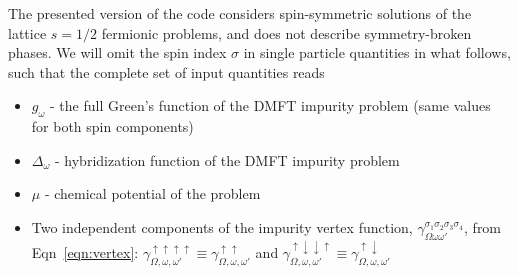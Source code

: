 \documentclass[3p,times,procedia]{elsarticle}
\begin{document}
The presented version of the code considers spin-symmetric solutions of the lattice $s=1/2$ fermionic problems, and does not describe symmetry-broken phases. We will omit the spin index $\sigma$ in single particle quantities in what follows, such that the complete set of input quantities reads
\begin{itemize}
\item $g_\omega$ - the full Green's function of the DMFT impurity problem (same values for both spin components)
\item $\Delta_{\omega}$ - hybridization function of the DMFT impurity problem
\item $\mu$ - chemical potential of the problem
\item Two independent components of the impurity vertex function, $\gamma_{\Omega\omega\omega'}^{\sigma_1\sigma_2\sigma_3\sigma_4}$, from Eqn~\eqref{eqn:vertex}: $\gamma_{\Omega,\omega,\omega'}^{\uparrow\uparrow\uparrow\uparrow} \equiv \gamma^{\uparrow\uparrow}_{\Omega,\omega,\omega'} $ and $\gamma_{\Omega,\omega,\omega'}^{\uparrow\downarrow\downarrow\uparrow} \equiv  \gamma^{\uparrow\downarrow}_{\Omega,\omega,\omega'} $
\end{itemize}
\end{document}
